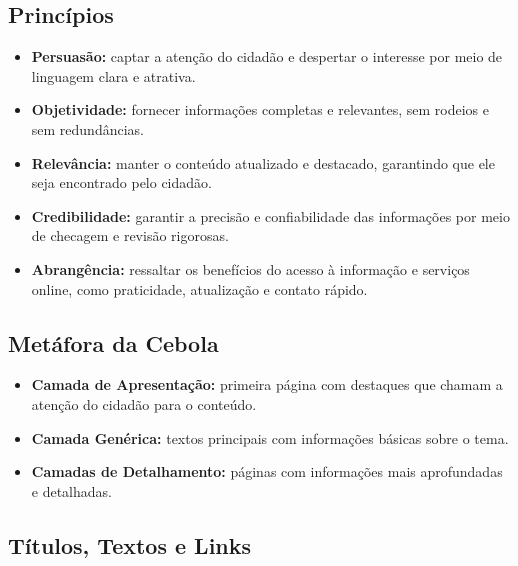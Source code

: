 \documentclass[
  12pt,
  openright,
  twoside,
  a4paper,
  english,
  french,
  spanish,
  brazil
]{abntex2}
\begin{document}
\subsection{Princípios}

\begin{itemize}
  \item \textbf{Persuasão:} captar a atenção do cidadão e despertar o interesse por meio de linguagem clara e atrativa.
  \item \textbf{Objetividade:} fornecer informações completas e relevantes, sem rodeios e sem redundâncias.
  \item \textbf{Relevância:} manter o conteúdo atualizado e destacado, garantindo que ele seja encontrado pelo cidadão.
  \item \textbf{Credibilidade:} garantir a precisão e confiabilidade das informações por meio de checagem e revisão rigorosas.
  \item \textbf{Abrangência:} ressaltar os benefícios do acesso à informação e serviços online, como praticidade, atualização e contato rápido.
\end{itemize}

\subsection{Metáfora da Cebola}

\begin{itemize}
  \item \textbf{Camada de Apresentação:} primeira página com destaques que chamam a atenção do cidadão para o conteúdo.
  \item \textbf{Camada Genérica:} textos principais com informações básicas sobre o tema.
  \item \textbf{Camadas de Detalhamento:} páginas com informações mais aprofundadas e detalhadas.
\end{itemize}

\subsection{Títulos, Textos e Links}
\end{document}
